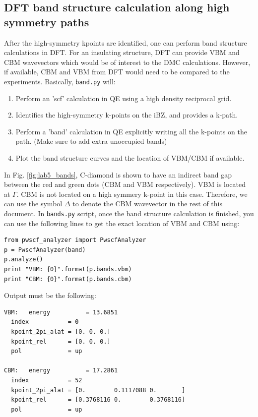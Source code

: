 \subsection{DFT band structure calculation along high symmetry paths}
After the high-symmetry kpoints are identified, one can perform band structure calculations in DFT. 
For an insulating structure, DFT can provide VBM and CBM wavevectors which would be of interest to the DMC calculations. 
However, if available, CBM and VBM from DFT would need to be compared to the experiments.  
Basically,  \texttt{band.py} will:
\begin{enumerate}
	\item Perform an 'scf' calculation in QE using a high density reciprocal grid.
	\item Identifies the high-symmetry k-points on the iBZ, and provides a k-path.
	\item Perform a 'band' calculation in QE explicitly writing all the k-points on the path. (Make sure to add extra unoccupied bands)
	\item Plot the band structure curves and the location of VBM/CBM if available.
\end{enumerate}
In Fig. \ref{fig:lab5_bands}, C-diamond is shown to have an indirect band gap between the red and green dots (CBM and VBM respectively). 
VBM is located at $\Gamma$. CBM is not located on a high symmery k-point in this case. 
Therefore, we can use the symbol $\Delta$ to denote the CBM wavevector in the rest of this document. 
In \texttt{bands.py} script, once the band structure calculation is finished, you can use the following lines to get the exact location of VBM and CBM using:
\begin{lstlisting}
from pwscf_analyzer import PwscfAnalyzer
p = PwscfAnalyzer(band)
p.analyze()
print "VBM: {0}".format(p.bands.vbm)
print "CBM: {0}".format(p.bands.cbm)
\end{lstlisting}
Output must be the following:
\begin{lstlisting}
VBM:   energy          = 13.6851
  index           = 0
  kpoint_2pi_alat = [0. 0. 0.]
  kpoint_rel      = [0. 0. 0.]
  pol             = up

CBM:   energy          = 17.2861
  index           = 52
  kpoint_2pi_alat = [0.        0.1117088 0.       ]
  kpoint_rel      = [0.3768116 0.        0.3768116]
  pol             = up
\end{lstlisting}
